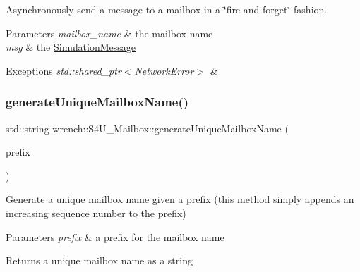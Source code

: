 Asynchronously send a message to a mailbox in a \char`\"{}fire and forget\char`\"{} fashion. 


\begin{DoxyParams}{Parameters}
{\em mailbox\+\_\+name} & the mailbox name \\
\hline
{\em msg} & the \hyperlink{classwrench_1_1_simulation_message}{Simulation\+Message}\\
\hline
\end{DoxyParams}

\begin{DoxyExceptions}{Exceptions}
{\em std\+::shared\+\_\+ptr$<$\+Network\+Error$>$} & \\
\hline
\end{DoxyExceptions}
\mbox{\label{classwrench_1_1_s4_u___mailbox_a0724d933ea0b85b8242a411333c2acd1}} 
\subsubsection{\texorpdfstring{generate\+Unique\+Mailbox\+Name()}{generateUniqueMailboxName()}}
{\footnotesize\ttfamily std\+::string wrench\+::\+S4\+U\+\_\+\+Mailbox\+::generate\+Unique\+Mailbox\+Name (\begin{DoxyParamCaption}\item[{std\+::string}]{prefix }\end{DoxyParamCaption})\hspace{0.3cm}{\ttfamily [static]}}



Generate a unique mailbox name given a prefix (this method simply appends an increasing sequence number to the prefix) 


\begin{DoxyParams}{Parameters}
{\em prefix} & a prefix for the mailbox name \\
\hline
\end{DoxyParams}
\begin{DoxyReturn}{Returns}
a unique mailbox name as a string 
\end{DoxyReturn}
\mbox{\label{classwrench_1_1_s4_u___mailbox_a71ba39ec19960b3fca334836e19edb9f}} 
